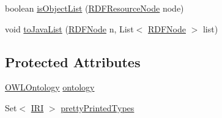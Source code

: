 \begin{DoxyCompactItemize}
\item 
boolean \hyperlink{classorg_1_1coode_1_1owlapi_1_1rdf_1_1renderer_1_1_r_d_f_renderer_base_af9f718ae98c42c8bb06bb035ced1eed6}{is\-Object\-List} (\hyperlink{classorg_1_1coode_1_1owlapi_1_1rdf_1_1model_1_1_r_d_f_resource_node}{R\-D\-F\-Resource\-Node} node)
\item 
void \hyperlink{classorg_1_1coode_1_1owlapi_1_1rdf_1_1renderer_1_1_r_d_f_renderer_base_a31b6f6e598c4d75bcef0f9af5d569984}{to\-Java\-List} (\hyperlink{classorg_1_1coode_1_1owlapi_1_1rdf_1_1model_1_1_r_d_f_node}{R\-D\-F\-Node} n, List$<$ \hyperlink{classorg_1_1coode_1_1owlapi_1_1rdf_1_1model_1_1_r_d_f_node}{R\-D\-F\-Node} $>$ list)
\end{DoxyCompactItemize}
\subsection*{Protected Attributes}
\begin{DoxyCompactItemize}
\item 
\hyperlink{interfaceorg_1_1semanticweb_1_1owlapi_1_1model_1_1_o_w_l_ontology}{O\-W\-L\-Ontology} \hyperlink{classorg_1_1coode_1_1owlapi_1_1rdf_1_1renderer_1_1_r_d_f_renderer_base_a1c2e169e03ca2cdf866ca19387b258e4}{ontology}
\item 
Set$<$ \hyperlink{classorg_1_1semanticweb_1_1owlapi_1_1model_1_1_i_r_i}{I\-R\-I} $>$ \hyperlink{classorg_1_1coode_1_1owlapi_1_1rdf_1_1renderer_1_1_r_d_f_renderer_base_ab833f1b7c15de6186793d524d85bdd0d}{pretty\-Printed\-Types}
\end{DoxyCompactItemize}

